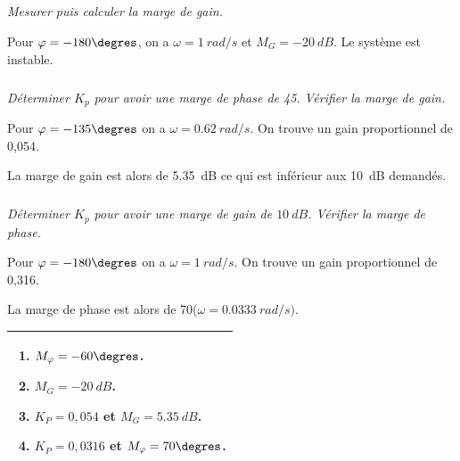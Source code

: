 \documentclass[10pt,fleqn]{article} %
\begin{document}
\begin{multicols}{2}
\subparagraph{}\textit{Mesurer puis calculer la marge de gain.}
\ifprof
\begin{corrige}
Pour $\varphi=-180\degres$, on a $\omega=\SI{1}{rad/s}$ et $M_{G}=\SI{-20}{dB}$. Le système est instable.
\end{corrige}
\else
\fi

\subparagraph{}\textit{Déterminer $K_p$ pour avoir une marge de phase de 45\degres. Vérifier la marge de gain. }
\ifprof
\begin{corrige}
Pour $\varphi=-135\degres$ on a $\omega=\SI{0,62}{rad/s}$. On trouve un gain proportionnel de 0,054.

La marge de gain est alors de \SI{5,35}{dB} ce qui est inférieur aux \SI{10}{dB} demandés.
\end{corrige}
\else
\fi

\subparagraph{}\textit{Déterminer $K_p$ pour avoir une marge de gain de $\SI{10}{dB}$. Vérifier la marge de phase. }
\ifprof
\begin{corrige}
Pour $\varphi=-180\degres$ on a $\omega=\SI{1}{rad/s}$. On trouve un gain proportionnel de 0,316.

La marge de phase est alors de 70\degres ($\omega=\SI{0,0333}{rad/s})$.
\end{corrige}
\else
\fi


\noindent
\begin{tabular}{|p{.9\linewidth}|}
\hline
\begin{enumerate}
\item $M_{\varphi}=-60\degres$.
\item $M_G=\SI{-20}{dB}$.
\item $K_P=0,054$ et $M_{G}=\SI{5,35}{dB}$.
\item $K_P=0,0316$ et $M_{\varphi}=70\degres$.
\end{enumerate}\\
\hline
\end{tabular}





%
%


\end{multicols}
\end{document}
